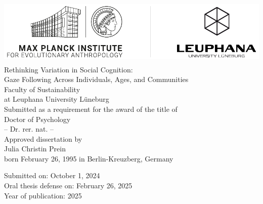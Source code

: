 \documentclass[
]{scrbook}
\author{}
\date{\vspace{-2.5em}}
\begin{document}
\frontmatter

\begin{titlepage}                   
    \begin{center}
        \includegraphics[height=3.2cm]{logo.pdf}\\[40mm]
        
        \huge {\linespread{1.5} Rethinking Variation in Social Cognition: \\ Gaze Following Across Individuals, Ages, and Communities}\\[30mm]
        
                
        \normalsize 
        Faculty of Sustainability \\ 
        at Leuphana University Lüneburg\\
        Submitted as a requirement for the award of the title of\\ [10mm]
        
        Doctor of Psychology\\
        -- Dr. rer. nat. --\\[10mm]
        
        Approved dissertation by\\
        Julia Christin Prein\\[10mm]
        
        born February 26, 1995 in Berlin-Kreuzberg, Germany
        
    \vspace*{\fill} 
    \end{center}
    
    \newpage
    \thispagestyle{empty}
    \begin{flushleft}
      \begin{normalsize}
      \vspace*{5mm}
      
            Submitted on: \tabto*{45mm} October 1, 2024 \\
            
            Oral thesis defense on: \tabto*{45mm} February 26, 2025 \\
            
            Year of publication: \tabto*{45mm} 2025 \\[10mm]
            

\end{normalsize}
\end{flushleft}
\end{titlepage}
\end{document}
